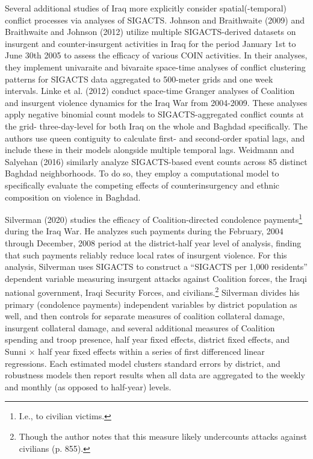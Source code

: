 \documentclass[12pt]{article}
\begin{document}
Several additional studies of Iraq more explicitly consider spatial(-temporal) conflict processes via analyses of SIGACTS. Johnson and Braithwaite (2009) and Braithwaite and Johnson (2012) utilize multiple SIGACTS-derived datasets on insurgent and counter-insurgent activities in Iraq for the period January 1st to June 30th 2005 to assess the efficacy of various COIN activities. In their analyses, they implement univaraite and bivaraite space-time analyses of conflict clustering patterns for SIGACTS data aggregated to 500-meter grids and one week intervals. Linke et al. (2012) conduct space-time Granger analyses of Coalition and insurgent violence dynamics for the Iraq War from 2004-2009. These analyses apply negative binomial count models to SIGACTS-aggregated conflict counts at the grid- three-day-level for both Iraq on the whole and Baghdad specifically. The authors use queen contiguity to calculate first- and second-order spatial lags, and include these in their models alongside multiple temporal lags. Weidmann and Salyehan (2016) similarly analyze SIGACTS-based event counts across 85 distinct Baghdad neighborhoods. To do so, they employ a computational model to specifically evaluate the competing effects of counterinsurgency and ethnic composition on violence in Baghdad.

Silverman (2020) studies the efficacy of Coalition-directed condolence payments\footnote{I.e., to civilian victims.} during the Iraq War. He analyzes such payments during the February, 2004 through December, 2008 period at the district-half year level of analysis, finding that such payments reliably reduce local rates of insurgent violence. For this analysis, Silverman uses SIGACTS to construct a ``SIGACTS per 1,000 residents'' dependent variable measuring insurgent attacks against Coalition forces, the Iraqi national government, Iraqi Security Forces, and civilians.\footnote{Though the author notes that this measure likely undercounts attacks against civilians (p. 855).} Silverman divides his primary (condolence payments) independent variables by district population as well, and then controls for separate measures of coalition collateral damage, insurgent collateral damage, and several additional measures of Coalition spending and troop presence, half year fixed effects, district fixed effects, and Sunni $\times$ half year fixed effects within a series of first differenced linear regressions. Each estimated model clusters standard errors by district, and robustness models then report results when all data are aggregated to the weekly and monthly (as opposed to half-year) levels.
\end{document}
